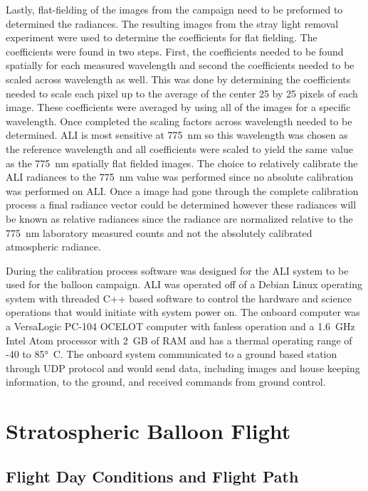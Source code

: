 \documentclass[12pt]{article}
\begin{document}
Lastly, flat-fielding of the images from the campaign need to be preformed to determined the radiances. The resulting images from the stray light removal experiment were used to determine the coefficients for flat fielding. The coefficients were found in two steps. First, the coefficients needed to be found spatially for each measured wavelength and second the coefficients needed to be scaled across wavelength as well. This was done by determining the coefficients needed to scale each pixel up to the average of the center 25 by 25 pixels of each image. These coefficients were averaged by using all of the images for a specific wavelength. Once completed the scaling factors across wavelength needed to be determined. ALI is most sensitive at 775~nm so this wavelength was chosen as the reference wavelength and all coefficients were scaled to yield the same value as the 775~nm spatially flat fielded images. The choice to relatively calibrate the ALI radiances to the 775~nm value was performed since no absolute calibration was performed on ALI. Once a image had gone through the complete calibration process a final radiance vector could be determined however these radiances will be known as relative radiances since the radiance are normalized relative to the 775~nm laboratory measured counts and not the absolutely calibrated atmospheric radiance.

During the calibration process software was designed for the ALI system to be used for the balloon campaign. ALI was operated off of a Debian Linux operating system with threaded C++ based software to control the hardware and science operations that would initiate with system power on. The onboard computer was a VersaLogic PC-104 OCELOT computer with fanless operation and a 1.6~GHz Intel Atom processor with 2~GB of RAM and has a thermal operating range of -40 to 85\si{\degree C}. The onboard system communicated to a ground based station through UDP protocol and would send data, including images and house keeping information, to the ground, and received commands from ground control.

\section{Stratospheric Balloon Flight}

\subsection{Flight Day Conditions and Flight Path}
\end{document}
